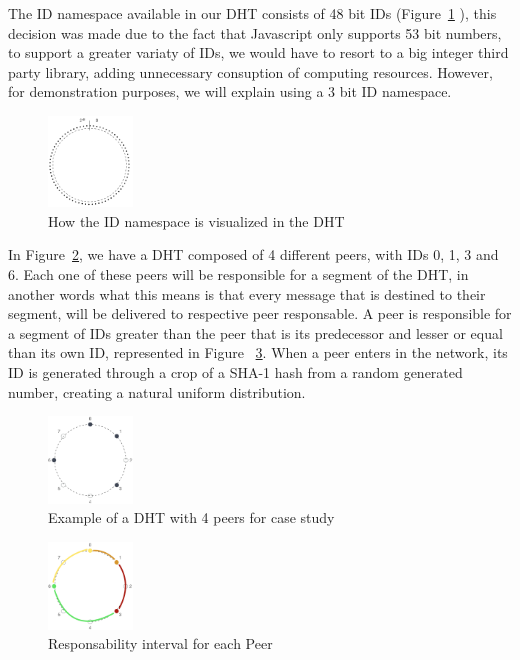 The ID namespace available in our DHT consists of 48 bit IDs (Figure~\ref{fig:c-1} ), this decision was made due to the fact that Javascript only supports 53 bit numbers, to support a greater variaty of IDs, we would have to resort to a big integer third party library, adding unnecessary consuption of computing resources. However, for demonstration purposes, we will explain using a 3 bit ID namespace.

\begin{figure}[h!]
  \centering
  \includegraphics[width=0.2\textwidth]{figs/chord-1}
  \caption{How the ID namespace is visualized in the DHT}
  \label{fig:c-1}
\end{figure}

In Figure~\ref{fig:c-2}, we have a DHT composed of 4 different peers, with IDs 0, 1, 3 and 6. Each one of these peers will be responsible for a segment of the DHT, in another words what this means is that every message that is destined to their segment, will be delivered to respective peer responsable. A peer is responsible for a segment of IDs greater than the peer that is its predecessor and lesser or equal than its own ID, represented in Figure ~\ref{fig:c-3}. When a peer enters in the network, its ID is generated through a crop of a SHA-1 hash from a random generated number, creating a natural uniform distribution.

\begin{figure}[h!]
  \centering
  \includegraphics[width=0.2\textwidth]{figs/chord-2}
  \caption{Example of a DHT with 4 peers for case study}
  \label{fig:c-2}
\end{figure}

\begin{figure}[h!]
  \centering
  \includegraphics[width=0.2\textwidth]{figs/chord-3}
  \caption{Responsability interval for each Peer}
  \label{fig:c-3}
\end{figure}

